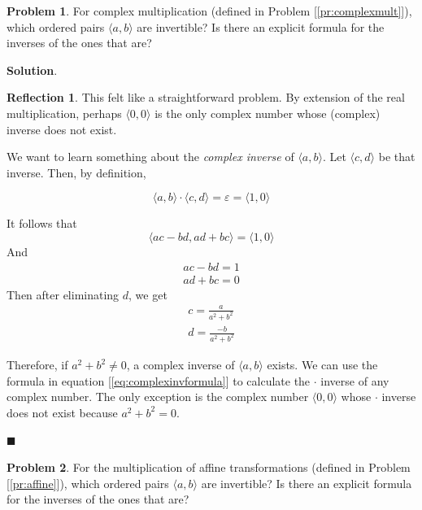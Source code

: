 \documentclass[english,notitlepage,smartquotes]{hgbreport}
\theoremstyle{definition}
\theoremstyle{definition}
\newtheorem{problem}{Problem}
\theoremstyle{remark}
\theoremstyle{definition}
\theoremstyle{plain}
\renewcommand\qedsymbol{$\blacksquare$}
\theoremstyle{definition}
\newtheorem{reflection}{Reflection}
\begin{document}
\begin{problem}
\label{pr:complexinv}
For complex multiplication (defined in Problem [\ref{pr:complexmult}]), which ordered pairs $\langle a,b\rangle$ are invertible? Is there an explicit formula for the inverses of the ones that are?
\end{problem}

\textbf{Solution}.

\begin{reflection}
This felt like a straightforward problem. By extension of the real multiplication, perhaps $\langle 0,0\rangle$ is the only complex number whose (complex) inverse does not exist.
\end{reflection}

We want to learn something about the \emph{complex inverse} of $\langle a,b\rangle$. Let $\langle c,d\rangle$ be that inverse. Then, by definition,

$$
\langle a,b\rangle\cdot\langle c,d\rangle=\varepsilon=\langle 1,0\rangle
$$

It follows that 
$$
\langle ac-bd,ad+bc\rangle=\langle1,0\rangle
$$
And
\begin{equation}
\!
\begin{aligned}
ac-bd=1 \\
ad+bc=0
\end{aligned}\label{eq:complexinv1}
\end{equation}
Then after eliminating $d$, we get
\begin{equation}
\!
\begin{aligned}
c=\frac{a}{a^2+b^2} \\
d=\frac{-b}{a^2+b^2}
\end{aligned}\label{eq:complexinvformula}
\end{equation}

Therefore, if ${a^2+b^2}\ne 0$, a complex inverse of $\langle a,b\rangle$ exists. We can use the formula in equation [\ref{eq:complexinvformula}] to calculate the $\cdot$ inverse of any complex number. The only exception is the complex number $\langle 0,0\rangle$ whose $\cdot$ inverse does not exist because $a^2+b^2=0$.

\qedsymbol

\begin{problem}
\label{pr:affineinv}
For the multiplication of affine transformations (defined in Problem [\ref{pr:affine}]), which ordered pairs $\langle a,b\rangle$ are invertible? Is there an explicit formula for the inverses of the ones that are?
\end{problem}
\end{document}
